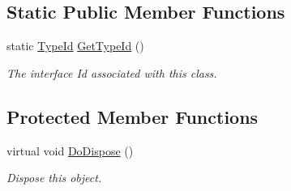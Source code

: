 \subsection*{Static Public Member Functions}
\begin{DoxyCompactItemize}
\item 
static \hyperlink{classns3_1_1TypeId}{Type\+Id} \hyperlink{classns3_1_1Ipv6StaticRouting_a46e2dbc750dbb14442a3ab2873d2fd5d}{Get\+Type\+Id} ()
\begin{DoxyCompactList}\small\item\em The interface Id associated with this class. \end{DoxyCompactList}\end{DoxyCompactItemize}
\subsection*{Protected Member Functions}
\begin{DoxyCompactItemize}
\item 
virtual void \hyperlink{classns3_1_1Ipv6StaticRouting_a0ab95912087070c9df2aca8a388076a6}{Do\+Dispose} ()
\begin{DoxyCompactList}\small\item\em Dispose this object. \end{DoxyCompactList}\end{DoxyCompactItemize}

